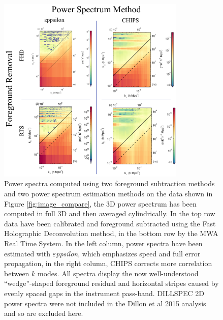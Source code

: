 \documentclass[preprint2]{aastex}
\def\eppsilon{{\it $\varepsilon$ppsilon}}
\def\empirical{DILLSPEC}
\def\dilloncite{Dillon et al 2015 }
\begin{document}
\begin{figure}[h!]
\begin{center}
\includegraphics[width=0.8\textwidth]{figures/MWA_PS_compare/MWA_PS_compare.png}
\caption{Power spectra computed using two foreground subtraction methods and two power spectrum estimation methods on the data shown in Figure \ref{fig:image_compare}, the 3D power spectrum has been computed in full 3D and then averaged cylindrically.  In the top row data have been calibrated and foreground subtracted using the Fast Holographic Deconvolution method, in the bottom row by the MWA Real Time System.  In the left column, power spectra have been estimated with \eppsilon, which emphasizes speed and full error propagation, in the right column, CHIPS corrects more correlation between $k$ modes.  All spectra display the now well-understood ``wedge''-shaped foreground residual and horizontal stripes caused by evenly spaced gaps in the instrument pass-band.  \empirical{} 2D power spectra were not included in the \dilloncite{} analysis and so are excluded here. \label{fig:pspec_compare}}
\end{center}
\end{figure}


\end{document}

